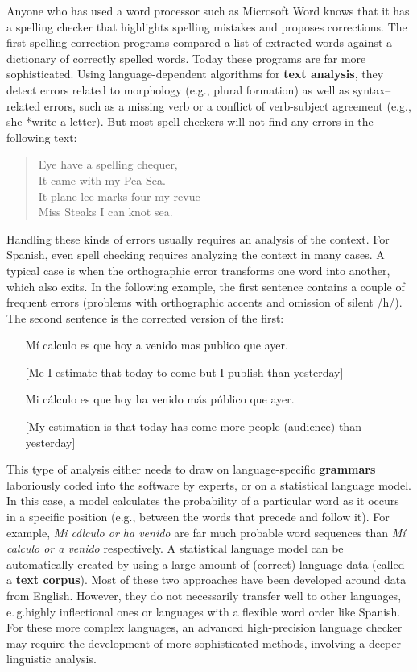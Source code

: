 \begin{multicols}{2}
Anyone who has used a word processor such as Microsoft Word knows that it has a spelling checker that highlights spelling mistakes and proposes corrections. The first spelling correction programs compared a list of extracted words against a dictionary of correctly spelled words. Today these programs are far more sophisticated. Using language-dependent algorithms for \textbf{text analysis}, they detect errors related to morphology (e.g., plural formation) as well as syntax--related errors, such as a missing verb or a conflict of verb-subject agreement (e.g., she *write a letter). But most spell checkers will not find any errors in the following text:

\begin{quote}
  Eye have a spelling chequer,\\
  It came with my Pea Sea.\\
  It plane lee marks four my revue\\
  Miss Steaks I can knot sea.\cite{zar1}
\end{quote}

Handling these kinds of errors usually requires an analysis of the context. For Spanish, even spell checking requires analyzing the context in many cases. A typical case is when the orthographic error transforms one word into another, which also exits. In the following example, the first sentence contains a couple of frequent errors (problems with orthographic accents and omission of silent /h/). The second sentence is the corrected version of the first:

\begin{itemize}
  \item[] Mí calculo es que hoy a venido mas publico que ayer.
  \item[] [Me I-estimate that today to come but I-publish than yesterday]
  \item[] Mi cálculo es que hoy ha venido más público que ayer.
  \item[] [My estimation is that today has come more people (audience) than yesterday]
\end{itemize}

This type of analysis either needs to draw on language-specific \textbf{grammars} laboriously coded into the software by experts, or on a statistical language model. In this case, a model calculates the probability of a particular word as it occurs in a specific position (e.g., between the words that precede and follow it). For example, \textit{Mi cálculo or ha venido} are far much probable word sequences than \textit{Mí calculo or a venido} respectively. A statistical language model can be automatically created by using a large amount of (correct) language data (called a \textbf{text corpus}). Most of these two approaches have been developed around data from English. However, they do not necessarily transfer well to other languages, e.\,g.highly inflectional ones or languages with a flexible word order like Spanish. For these more complex languages, an advanced high-precision language checker may require the development of more sophisticated methods, involving a deeper linguistic analysis. 
\columnbreak


\end{multicols}
